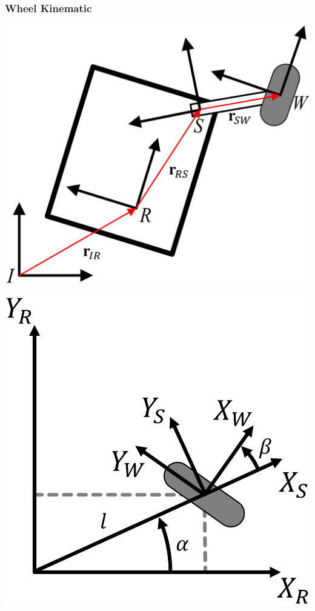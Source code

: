 \subsubsection{Wheel Kinematic}
\begin{minipage}[b]{0.48\linewidth}
    \includegraphics[width=\linewidth]{./Figures/03_WheelEquation.png}
\end{minipage}
\begin{minipage}[b]{0.48\linewidth}
    \includegraphics[width=\linewidth]{./Figures/03_StandardWheel.png}
\end{minipage}

